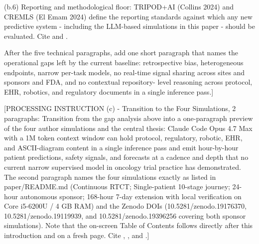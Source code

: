 (b.6) Reporting and methodological floor: TRIPOD+AI (Collins 2024) and
CREMLS (El Emam 2024) define the reporting standards against which any new
predictive system - including the LLM-based simulations in this paper -
should be evaluated. Cite \cite{Collins2024TRIPODAI} and
\cite{ElEmam2024CREMLS}.

After the five technical paragraphs, add one short paragraph that names
the operational gaps left by the current baseline: retrospective bias,
heterogeneous endpoints, narrow per-task models, no real-time signal
sharing across sites and sponsors and FDA, and no contextual repository-
level reasoning across protocol, EHR, robotics, and regulatory documents
in a single inference pass.]

[PROCESSING INSTRUCTION (c) - Transition to the Four Simulations, 2
paragraphs: Transition from the gap analysis above into a one-paragraph
preview of the four author simulations and the central thesis: Claude Code
Opus 4.7 Max with a 1M token context window can hold protocol, regulatory,
robotic, EHR, and ASCII-diagram content in a single inference pass and
emit hour-by-hour patient predictions, safety signals, and forecasts at a
cadence and depth that no current narrow supervised model in oncology
trial practice has demonstrated. The second paragraph names the four
simulations exactly as listed in paper/README.md (Continuous RTCT;
Single-patient 10-stage journey; 24-hour autonomous sponsor; 168-hour
7-day extension with local verification on Core i5-6200U / 4 GB RAM) and
the Zenodo DOIs (10.5281/zenodo.19176370, 10.5281/zenodo.19119939, and
10.5281/zenodo.19396256 covering both sponsor simulations). Note that
the on-screen Table of Contents follows directly after this introduction
and on a fresh page. Cite \cite{kawchak_2026_19176370},
\cite{kawchak_2026_19119939}, and \cite{kawchak_2026_19396256}.]
